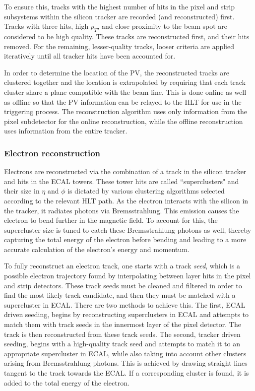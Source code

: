 To ensure this, tracks with the highest number of hits in the pixel and strip subsystems within the silicon tracker are recorded (and reconstructed) first. Tracks with three hits, high $p_{T}$, and close proximity to the beam spot are considered to be high quality. These tracks are reconstructed first, and their hits removed. For the remaining, lesser-quality tracks, looser criteria are applied iteratively until all tracker hits have been accounted for.

In order to determine the location of the PV, the reconstructed tracks are clustered together and the location is extrapolated by requiring that each track cluster share a plane compatible with the beam line. This is done online as well as offline so that the PV information can be relayed to the HLT for use in the triggering process. The reconstruction algorithm   uses only information from the pixel subdetector for the online reconstruction, while the offline reconstruction uses information from the entire tracker.

\subsubsection{Electron reconstruction}

Electrons are reconstructed via the combination of a track in the silicon tracker and hits in the ECAL towers. These tower hits are called ``superclusters" and their size in $\eta$ and $\phi$ is dictated by various clustering algorithms selected according to the relevant HLT path. As the electron interacts with the silicon in the tracker, it radiates photons via Bremsstrahlung. This emission causes the electron to bend further in the magnetic field. To account for this, the supercluster size is tuned to catch these Bremsstrahlung photons as well, thereby capturing the total energy of the electron before bending and leading to a more accurate calculation of the electron's energy and momentum. 

To fully reconstruct an electron track, one starts with a track \emph{seed}, which is a possible electron trajectory found by interpolating between layer hits in the pixel and strip detectors. These track seeds must be cleaned and filtered in order to find the most likely track candidate, and then they must be matched with a supercluster in ECAL. There are two methods to achieve this. The first, ECAL driven seeding, begins by reconstructing superclusters in ECAL and attempts to match them with track seeds in the innermost layer of the pixel detector. The track is then reconstructed from these track seeds. The second, tracker driven seeding, begins with a high-quality track seed and attempts to match it to an appropriate supercluster in ECAL, while also taking into account other clusters arising from Bremsstrahlung photons. This is achieved by drawing straight lines tangent to the track towards the ECAL. If a corresponding cluster is found, it is added to the total energy of the electron.


